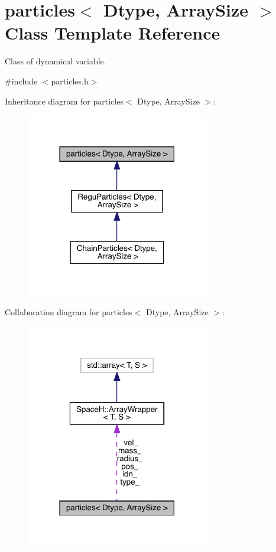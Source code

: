 \hypertarget{classparticles}{}\section{particles$<$ Dtype, Array\+Size $>$ Class Template Reference}
\label{classparticles}


Class of dynamical variable.  




{\ttfamily \#include $<$particles.\+h$>$}



Inheritance diagram for particles$<$ Dtype, Array\+Size $>$\+:
\nopagebreak
\begin{figure}[H]
\begin{center}
\leavevmode
\includegraphics[width=225pt]{classparticles__inherit__graph}
\end{center}
\end{figure}


Collaboration diagram for particles$<$ Dtype, Array\+Size $>$\+:
\nopagebreak
\begin{figure}[H]
\begin{center}
\leavevmode
\includegraphics[width=225pt]{classparticles__coll__graph}
\end{center}
\end{figure}
